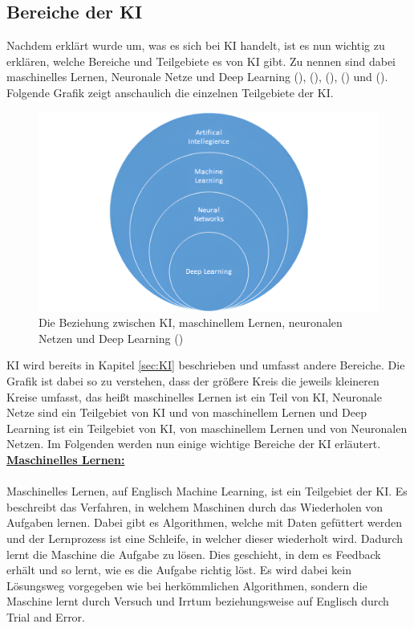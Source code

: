 \documentclass[12pt,toc=bib,toc=listof]{scrreprt}
\begin{document}
\subsection{Bereiche der KI} %
\label{sec:bereicheDerKI}
Nachdem erklärt wurde um, was es sich bei KI handelt, ist es nun wichtig zu erklären, welche Bereiche und Teilgebiete es von KI gibt. Zu nennen sind dabei maschinelles Lernen, Neuronale Netze und Deep Learning (\cite{Bhatt2021}), (\cite{Hecker2018}), (\cite{Mocko2021}), (\cite{Roscher2025}) und (\cite{Zhu2021}).
Folgende Grafik zeigt anschaulich die einzelnen Teilgebiete der KI.
\begin{figure} [H]
    \centering
    \includegraphics[width=0.75\linewidth]{./Bilder/Mocko_Die Beziehung zwischen KI, maschinellem Lernen, neuronalen Netzen und Deep Learning.png}
    \caption{Die Beziehung zwischen KI, maschinellem Lernen, neuronalen Netzen und Deep Learning (\cite{Mocko2021})}
    \label{fig:enter-label}
\end{figure}
\noindent KI wird bereits in Kapitel \ref{sec:KI}  beschrieben und umfasst andere Bereiche. Die Grafik ist dabei so zu verstehen, dass der größere Kreis die jeweils kleineren Kreise umfasst, das heißt maschinelles Lernen ist ein Teil von KI, Neuronale Netze sind ein Teilgebiet von KI und von maschinellem Lernen und Deep Learning ist ein Teilgebiet von KI, von maschinellem Lernen und von Neuronalen Netzen. Im Folgenden werden nun einige wichtige Bereiche der KI erläutert.\\
\newpage
\noindent\textbf{\underline{Maschinelles Lernen:}}\\
\\
Maschinelles Lernen, auf Englisch Machine Learning, ist ein Teilgebiet der KI. Es beschreibt das Verfahren, in welchem Maschinen durch das Wiederholen von Aufgaben lernen. Dabei gibt es Algorithmen, welche mit Daten gefüttert werden und der Lernprozess ist eine Schleife, in welcher dieser wiederholt wird. Dadurch lernt die Maschine die Aufgabe zu lösen. Dies geschieht, in dem es Feedback erhält und so lernt, wie es die Aufgabe richtig löst. Es wird dabei kein Lösungsweg vorgegeben wie bei herkömmlichen Algorithmen, sondern die Maschine lernt durch Versuch und Irrtum beziehungsweise auf Englisch durch Trial and Error.\\
\end{document}
